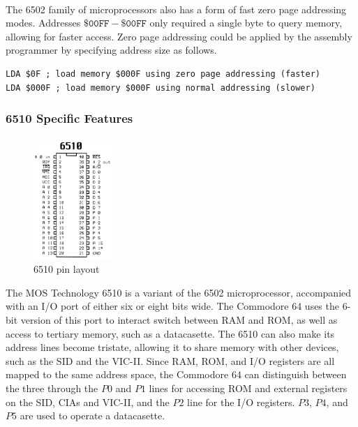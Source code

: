 \documentclass{article}
\begin{document}
\paragraph{}
The 6502 family of microprocessors also has a form of fast zero page addressing modes. Addresses $\mathtt{\$00FF - \$00FF}$ only required a single byte to query memory, allowing for faster access. Zero page addressing could be applied by the assembly programmer by specifying address size as follows.
\begin{lstlisting}
LDA $0F ; load memory $000F using zero page addressing (faster)
LDA $000F ; load memory $000F using normal addressing (slower)
\end{lstlisting}

\subsubsection{6510 Specific Features}
\paragraph{}
\begin{figure}
\vspace{-20pt}
\begin{center}
\includegraphics[width=3cm]{6510}
\caption{6510 pin layout}
\end{center}
\end{figure}
The MOS Technology 6510 is a variant of the 6502 microprocessor, accompanied with an I/O port of either six or eight bits wide. The Commodore 64 uses the 6-bit version of this port to interact switch between RAM and ROM, as well as access to tertiary memory, such as a datacasette. The 6510 can also make its address lines become tristate, allowing it to share memory with other devices, such as the SID and the VIC-II. Since RAM, ROM, and I/O registers are all mapped to the same address space, the Commodore 64 can distinguish between the three through the $P0$ and $P1$ lines for accessing ROM and external registers on the SID, CIAs and VIC-II, and the $P2$ line for the I/O registers. $P3$, $P4$, and $P5$ are used to operate a datacasette.
\end{document}
